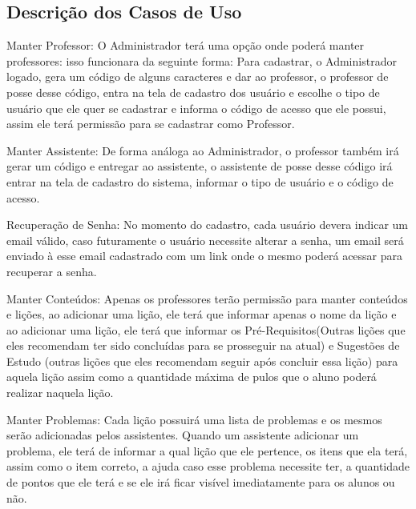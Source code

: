 \subsection{Descri\c{c}\~ao dos Casos de Uso}

\begin{alineascomponto}
	\item Manter Professor: O Administrador terá uma opção onde poderá manter 
professores: isso funcionara da seguinte forma: Para cadastrar, o Administrador 
logado, gera um código de alguns caracteres e dar ao professor, o professor de 
posse desse código, entra na tela de cadastro dos usuário e escolhe o tipo de 
usuário que ele quer se cadastrar e informa o código de acesso que ele possui, 
assim ele terá permissão para se cadastrar como Professor.

	\item Manter Assistente: De forma análoga ao Administrador, o professor 
também irá gerar um código e entregar ao assistente, o assistente de posse 
desse código irá entrar na tela de cadastro do sistema, informar o tipo de 
usuário e o código de acesso.

	\item Recuperação de Senha: No momento do cadastro, cada usuário devera 
indicar um email v\'alido, caso futuramente o usuário necessite 
alterar a senha, um email será enviado à esse email cadastrado com um link onde 
o mesmo poder\'a acessar para recuperar a senha.

	\item Manter Conte\'udos: Apenas os professores terão permissão para manter 
conte\'udos e lições, ao adicionar uma lição, ele terá que informar apenas o 
nome da lição e ao adicionar uma lição, ele terá que informar os 
Pré-Requisitos(Outras lições que eles recomendam ter sido concluídas para se 
prosseguir na atual) e Sugestões de Estudo (outras lições que eles recomendam 
seguir após concluir essa lição) para aquela lição assim como a quantidade 
máxima de pulos que o aluno poderá realizar naquela lição.

	\item Manter Problemas: Cada lição possuirá uma lista de problemas e os 
mesmos serão adicionadas pelos assistentes. Quando um assistente adicionar 
um problema, ele terá de informar a qual lição que ele pertence, os itens que 
ela terá, assim como o item correto, a ajuda caso esse problema necessite ter, 
a quantidade de pontos que ele terá e se ele irá ficar visível imediatamente 
para os alunos ou não.


\end{alineascomponto}
